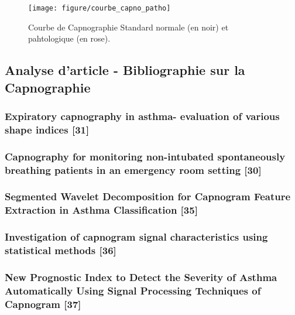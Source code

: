 \documentclass[12pt,]{article}
\begin{document}
\begin{figure}[h!]

{\centering \texttt{[image: figure/courbe\_capno\_patho]} 

}

\caption{Courbe de Capnographie Standard normale (en noir) et pahtologique (en rose).}\label{fig:unnamed-chunk-3}
\end{figure}

\pagebreak

\subsection{Analyse d'article - Bibliographie sur la
Capnographie}\label{analyse-darticle---bibliographie-sur-la-capnographie}

\subsubsection{Expiratory capnography in asthma- evaluation of various
shape indices
{[}31{]}}\label{expiratory-capnography-in-asthma--evaluation-of-various-shape-indices-you1994expiratory}

\subsubsection{Capnography for monitoring non-intubated spontaneously
breathing patients in an emergency room setting
{[}30{]}}\label{capnography-for-monitoring-non-intubated-spontaneously-breathing-patients-in-an-emergency-room-setting-egleston1997capnography}

\subsubsection{Segmented Wavelet Decomposition for Capnogram Feature
Extraction in Asthma Classification
{[}35{]}}\label{segmented-wavelet-decomposition-for-capnogram-feature-extraction-in-asthma-classification-betancourt2014segmented}

\subsubsection{Investigation of capnogram signal characteristics using
statistical methods
{[}36{]}}\label{investigation-of-capnogram-signal-characteristics-using-statistical-methods-kazemi2012investigation}

\subsubsection{New Prognostic Index to Detect the Severity of Asthma
Automatically Using Signal Processing Techniques of Capnogram
{[}37{]}}\label{new-prognostic-index-to-detect-the-severity-of-asthma-automatically-using-signal-processing-techniques-of-capnogram-kazemi2016new}
\end{document}

